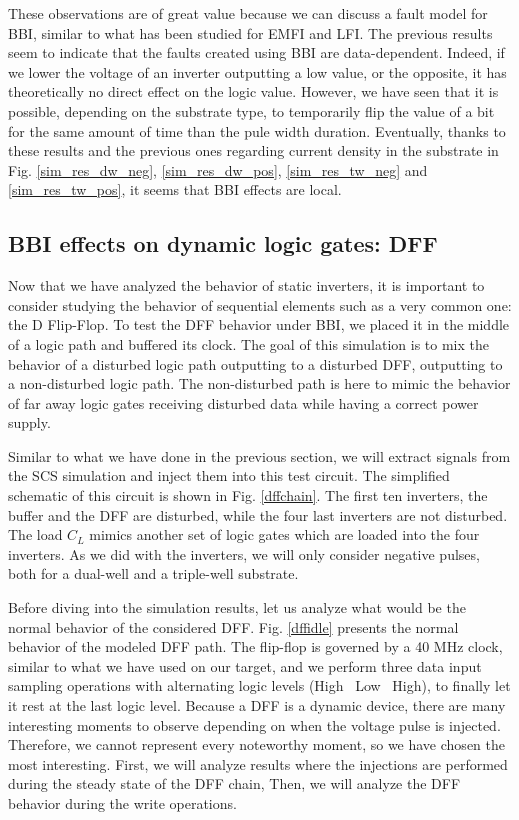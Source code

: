 	These observations are of great value because we can discuss a fault model for BBI, similar to what has been studied for EMFI and LFI.
	The previous results seem to indicate that the faults created using BBI are data-dependent.
	Indeed, if we lower the voltage of an inverter outputting a low value, or the opposite, it has theoretically no direct effect on the logic value.
	However, we have seen that it is possible, depending on the substrate type, to temporarily flip the value of a bit for the same amount of time than the pule width duration.
	Eventually, thanks to these results and the previous ones regarding current density in the substrate in Fig. \ref{sim_res_dw_neg}, \ref{sim_res_dw_pos}, \ref{sim_res_tw_neg} and \ref{sim_res_tw_pos}, it seems that BBI effects are local.

\subsection{BBI effects on dynamic logic gates: DFF}
	
	Now that we have analyzed the behavior of static inverters, it is important to consider studying the behavior of sequential elements such as a very common one: the D Flip-Flop.
	To test the DFF behavior under BBI, we placed it in the middle of a logic path and buffered its clock.
	The goal of this simulation is to mix the behavior of a disturbed logic path outputting to a disturbed DFF, outputting to a non-disturbed logic path.
	The non-disturbed path is here to mimic the behavior of far away logic gates receiving disturbed data while having a correct power supply.
	
	Similar to what we have done in the previous section, we will extract signals from the SCS simulation and inject them into this test circuit.
	The simplified schematic of this circuit is shown in Fig. \ref{dffchain}.
	The first ten inverters, the buffer and the DFF are disturbed, while the four last inverters are not disturbed.
	The load $C_L$ mimics another set of logic gates which are loaded into the four inverters.
	As we did with the inverters, we will only consider negative pulses, both for a dual-well and a triple-well substrate.
	
	Before diving into the simulation results, let us analyze what would be the normal behavior of the considered DFF.
	Fig. \ref{dffidle} presents the normal behavior of the modeled DFF path.
	The flip-flop is governed by a 40 MHz clock, similar to what we have used on our target, and we perform three data input sampling operations with alternating logic levels (High \textrightarrow\ Low \textrightarrow\ High), to finally let it rest at the last logic level.
	Because a DFF is a dynamic device, there are many interesting moments to observe depending on when the voltage pulse is injected.
	Therefore, we cannot represent every noteworthy moment, so we have chosen the most interesting.
	First, we will analyze results where the injections are performed during the steady state of the DFF chain,
	Then, we will analyze the DFF behavior during the write operations.
	
